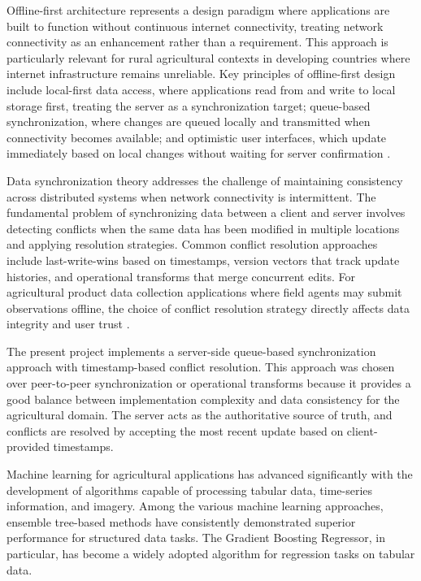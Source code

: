 Offline-first architecture represents a design paradigm where applications are built to function without continuous internet connectivity, treating network connectivity as an enhancement rather than a requirement. This approach is particularly relevant for rural agricultural contexts in developing countries where internet infrastructure remains unreliable. Key principles of offline-first design include local-first data access, where applications read from and write to local storage first, treating the server as a synchronization target; queue-based synchronization, where changes are queued locally and transmitted when connectivity becomes available; and optimistic user interfaces, which update immediately based on local changes without waiting for server confirmation \cite{islam2021}.

Data synchronization theory addresses the challenge of maintaining consistency across distributed systems when network connectivity is intermittent. The fundamental problem of synchronizing data between a client and server involves detecting conflicts when the same data has been modified in multiple locations and applying resolution strategies. Common conflict resolution approaches include last-write-wins based on timestamps, version vectors that track update histories, and operational transforms that merge concurrent edits. For agricultural product data collection applications where field agents may submit observations offline, the choice of conflict resolution strategy directly affects data integrity and user trust \cite{islam2021}.

The present project implements a server-side queue-based synchronization approach with timestamp-based conflict resolution. This approach was chosen over peer-to-peer synchronization or operational transforms because it provides a good balance between implementation complexity and data consistency for the agricultural domain. The server acts as the authoritative source of truth, and conflicts are resolved by accepting the most recent update based on client-provided timestamps.

Machine learning for agricultural applications has advanced significantly with the development of algorithms capable of processing tabular data, time-series information, and imagery. Among the various machine learning approaches, ensemble tree-based methods have consistently demonstrated superior performance for structured data tasks. The Gradient Boosting Regressor, in particular, has become a widely adopted algorithm for regression tasks on tabular data.

